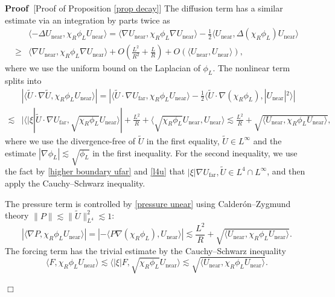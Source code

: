 \documentclass[11pt,a4paper]{article}
\numberwithin{equation}{section}
\newcommand{\tmop}[1]{\ensuremath{\operatorname{#1}}}
\newenvironment{proof}{\noindent\textbf{Proof\ }}{\hspace*{\fill}$\Box$\medskip}
\begin{document}
\begin{proof}[Proof of Proposition \ref{prop decay}]
The diffusion term has a similar estimate via an integration by parts twice as \[\begin{aligned}
&\langle - \Delta
       U_{\tmop{near}},\chi_R\phi_{L}U_{\tmop{near}}\rangle=\langle \nabla
       U_{\tmop{near}},\chi_R\phi_{L}\nabla U_{\tmop{near}}\rangle-\frac12\langle 
       U_{\tmop{near}},\Delta(\chi_R \phi_{L})U_{\tmop{near}}\rangle\\\geqslant&\langle \nabla
       U_{\tmop{near}},\chi_R\phi_{L}\nabla U_{\tmop{near}}\rangle+O(\frac{L^2}{R^2}+\frac{L}{R})+O(\langle 
       U_{\tmop{near}}, U_{\tmop{near}}\rangle),\end{aligned}\]
where we use the uniform bound on the Laplacian of $\phi_L$. The nonlinear term splits into 
\[\begin{aligned}
&|\langle \widetilde{U} \cdot \nabla \widetilde{U},\chi_R\phi_{L} U_{\tmop{near}}\rangle|=|\langle \widetilde{U} \cdot \nabla U_{\tmop{far}},\chi_R\phi_{L} U_{\tmop{near}}\rangle-\frac12\langle \widetilde{U}  \cdot\nabla (\chi_R\phi_{L}), |U_{\tmop{near}}|^2\rangle|\\\lesssim&|\langle |\xi|\widetilde{U} \cdot \nabla U_{\tmop{far}},\sqrt{\chi_R\phi_{L}} U_{\tmop{near}}\rangle|+\frac {L^2}{R}+\langle 
       \sqrt{\chi_R\phi_{L}}U_{\tmop{near}}, U_{\tmop{near}}\rangle\lesssim \frac {L^2}{R}+\sqrt{\langle 
       U_{\tmop{near}},\chi_R\phi_{L}U_{\tmop{near}}\rangle},&\end{aligned}\]
where we use the divergence-free of $\widetilde{U}$ in the first equality, $\widetilde{U}\in L^\infty$ and the estimate $|\nabla\phi_L|\lesssim\sqrt{\phi_L}$ in the first inequality. For the second inequality, we use the fact by \eqref{higher boundary ufar} and \eqref{l4u} that $|\xi|\nabla U_{\tmop{far}}, \widetilde{U}\in L^4\cap L^\infty$, and then
apply the Cauchy--Schwarz inequality.
       
The pressure term is controlled by \eqref{pressure unear} using Calderón–Zygmund theory $\|P\|\lesssim \|\widetilde{U}\|^2_{L^4}\lesssim1$:
\[|\langle \nabla P,\chi_R\phi_{L} U_{\tmop{near}}\rangle|=|-\langle P\nabla (\chi_R\phi_{L}), U_{\tmop{near}}\rangle|\lesssim  \frac {L^2}{R}+\sqrt{\langle 
       U_{\tmop{near}},\chi_R\phi_{L}U_{\tmop{near}}\rangle}.\]
The forcing term has the trivial estimate by the Cauchy--Schwarz inequality \[\langle F,\chi_R\phi_{L} U_{\tmop{near}}\rangle\lesssim \langle |\xi|F, \sqrt{\chi_R\phi_{L}}U_{\tmop{near}}\rangle\lesssim\sqrt{\langle 
       U_{\tmop{near}},\chi_R\phi_{L}U_{\tmop{near}}\rangle}.\]


\end{proof}
\end{document}
